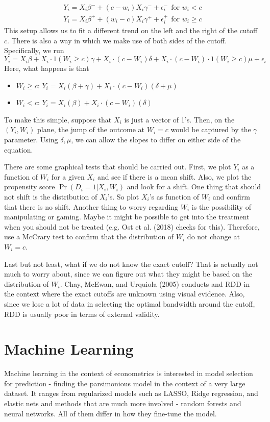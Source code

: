 \documentclass[12pt]{article}
\theoremstyle{definition}
\theoremstyle{property}
\theoremstyle{assumption}
\theoremstyle{example}
\theoremstyle{comment}
\begin{document}
\begin{gather*}
Y_i = X_i\beta^- +(c-w_i)X_i\gamma^-+\epsilon_i^-\ \ \text{for }w_i<c\\
Y_i = X_i\beta^+ +(w_i-c)X_i\gamma^++\epsilon_i^+\ \ \text{for }w_i\geq c
\end{gather*}
This setup allows us to fit a different trend on the left and the right of the cutoff $c$. There is also a way in which we make use of both sides of the cutoff. Specifically, we run
\[
Y_i = X_i\beta+ X_i \cdot 1(W_i\geq c)\gamma+X_i\cdot(c-W_i)\delta+X_i\cdot (c-W_i)\cdot 1(W_i\geq c) \mu +\epsilon_i
\]
Here, what happens is that
\begin{itemize}
\item $W_i\geq c$: $Y_i=X_i(\beta+\gamma)+X_i\cdot(c-W_i)(\delta+\mu)$
\item $W_i< c$: $Y_i=X_i(\beta)+X_i\cdot(c-W_i)(\delta)$
\end{itemize}
To make this simple, suppose that $X_i$ is just a vector of 1's. Then, on the $(Y_i, W_i)$ plane,  the jump of the outcome at $W_i=c$ would be captured by the $\gamma$ parameter. Using $\delta, \mu$, we can allow the slopes to differ on either side of the equation. \par
There are some graphical tests that should be carried out. First, we plot $Y_i$ as a function of $W_i$ for a given $X_i$ and see if there is a mean shift. Also, we plot the propensity score $\Pr(D_i=1|X_i, W_i)$ and look for a shift. One thing that should not shift is the distribution of $X_i$'s. So plot $X_i$'s as function of $W_i$ and confirm that there is no shift. Another thing to worry regarding $W_i$ is the possibility of manipulating or gaming. Maybe it might be possible to get into the treatment when you should not be treated (e.g. Ost et al. (2018) checks for this). Therefore, use a McCrary test to confirm that the distribution of $W_i$ do not change at $W_i=c$. \par
Last but not least, what if we do not know the exact cutoff? That is actually not much to worry about, since we can figure out what they might be based on the distribution of $W_i$. Chay, McEwan, and Urquiola (2005) conducts and RDD in the context where the exact cutoffs are unknown using visual evidence. Also, since we lose a lot of data in selecting the optimal bandwidth around the cutoff, RDD is usually poor in terms of external validity.

\section{Machine Learning}
Machine learning in the context of econometrics is interested in model selection for prediction - finding the parsimonious model in the context of a very large dataset. It ranges from regularized models such as LASSO, Ridge regression, and elastic nets and methods that are much more involved - random forests and neural networks. All of them differ in how they fine-tune the model. \par
\end{document}
